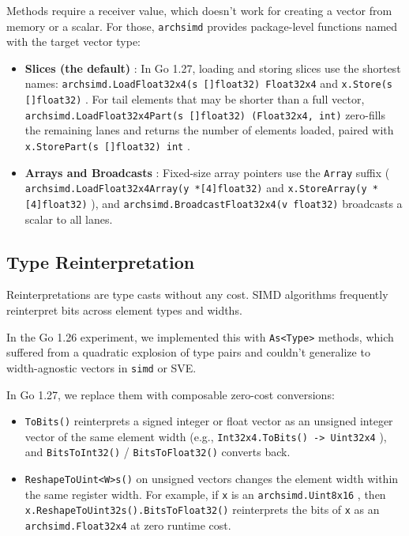 \documentclass[11pt,a4paper]{article}
\begin{document}
Methods require a receiver value, which doesn't work for creating a vector from memory or a scalar. For those, \texttt{archsimd} provides package-level functions named with the target vector type:

\begin{itemize}
\item \textbf{Slices (the default)} : In Go 1.27, loading and storing slices use the shortest names: \texttt{archsimd.LoadFloat32x4(s []float32) Float32x4} and \texttt{x.Store(s []float32)} . For tail elements that may be shorter than a full vector, \texttt{archsimd.LoadFloat32x4Part(s []float32) (Float32x4, int)} zero-fills the remaining lanes and returns the number of elements loaded, paired with \texttt{x.StorePart(s []float32) int} .
\item \textbf{Arrays and Broadcasts} : Fixed-size array pointers use the \texttt{Array} suffix ( \texttt{archsimd.LoadFloat32x4Array(y *[4]float32)} and \texttt{x.StoreArray(y *[4]float32)} ), and \texttt{archsimd.BroadcastFloat32x4(v float32)} broadcasts a scalar to all lanes.
\end{itemize}

\subsection{Type Reinterpretation}

Reinterpretations are type casts without any cost. SIMD algorithms frequently reinterpret bits across element types and widths.

In the Go 1.26 experiment, we implemented this with \texttt{As<Type>} methods, which suffered from a quadratic explosion of type pairs and couldn't generalize to width-agnostic vectors in \texttt{simd} or SVE.

In Go 1.27, we replace them with composable zero-cost conversions:

\begin{itemize}
\item \texttt{ToBits()} reinterprets a signed integer or float vector as an unsigned integer vector of the same element width (e.g., \texttt{Int32x4.ToBits() -> Uint32x4} ), and \texttt{BitsToInt32()} / \texttt{BitsToFloat32()} converts back.
\item \texttt{ReshapeToUint<W>s()} on unsigned vectors changes the element width within the same register width. For example, if \texttt{x} is an \texttt{archsimd.Uint8x16} , then \texttt{x.ReshapeToUint32s().BitsToFloat32()} reinterprets the bits of \texttt{x} as an \texttt{archsimd.Float32x4} at zero runtime cost.
\end{itemize}
\end{document}
